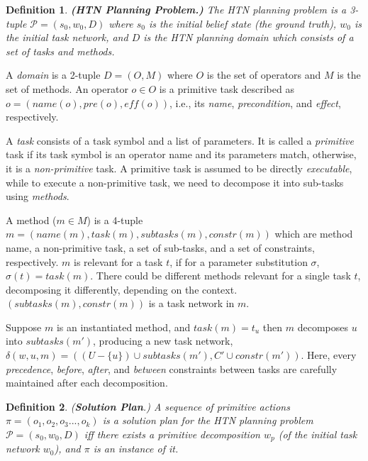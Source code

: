 \documentclass[letterpaper]{article} %
\newtheorem{definition}{Definition}
\begin{document}
\begin{definition}
\textbf{(HTN Planning Problem.)} 
The HTN planning
problem is a 3-tuple $\mathcal{P} = (s_0, w_0, D)$ where $s_0$ is the initial belief state (the ground truth), $w_0$ is the initial task network, and $D$ is the HTN planning domain which consists of a set of tasks and methods.
\end{definition}
A \textit{domain} is a 2-tuple $D=(O, M)$ where $O$ is the set of operators and $M$ is the set of methods. 
An operator $o \in O$ is a primitive task described as $o=(name(o), pre(o), \textit{eff}(o))$, i.e., its \textit{name}, \textit{precondition}, and \textit{effect}, respectively. 

A \textit{task} consists of a task symbol and a list of parameters. It is called a \textit{primitive} task if its task symbol is an operator name and its parameters match, otherwise, it is a \textit{non-primitive} task. A primitive task is assumed to be directly \textit{executable}, while to execute a non-primitive task, we need to decompose it into sub-tasks using \textit{methods}. 

A method ($m \in M$) is a 4-tuple $m=(name(m),task(m),subtasks(m),constr(m))$ which are method name, a non-primitive task, a set of sub-tasks, and a set of constraints, respectively. $m$ is relevant for a task $t$, if for a parameter substitution $\sigma$, $\sigma(t) = task(m)$. There could be different methods relevant for a single task $t$, decomposing it differently, depending on the context. $(subtasks(m),constr(m))$ is a task network in $m$.      

Suppose $m$ is an instantiated method, and $task(m)=t_u$ then $m$ decomposes $u$ into $subtasks(m')$, producing a new task network, $\delta(w,u,m)=((U-\{u\})\cup subtasks(m'),C'\cup constr(m'))$.
Here, every \textit{precedence}, \textit{before}, \textit{after}, and \textit{between} constraints between tasks are carefully maintained after each decomposition.

\begin{definition}   
(\textbf{Solution Plan}.) 
{A sequence of primitive actions $\pi=(o_1,o_2,o_3...,o_k)$ is a solution plan for the HTN planning problem $\mathcal{P}=(s_0,w_0,D)$ iff there exists a primitive decomposition $w_p$ (of the initial task network $w_0$), and $\pi$ is an instance of it. 
}  
\label{def:htn-sol-plan}
\end{definition}
\end{document}
